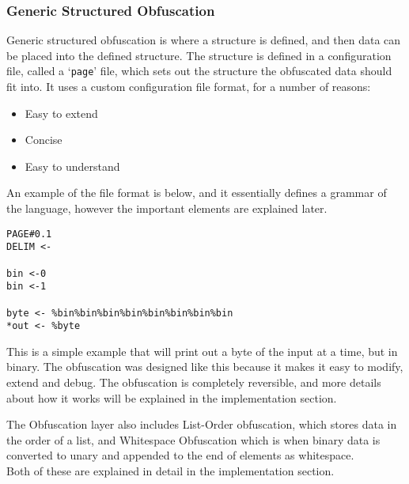 \subsubsection*{Generic Structured Obfuscation}
Generic structured obfuscation is where a structure is defined, and then data can be placed into the defined structure.
The structure is defined in a configuration file, called a `\texttt{page}' file, which sets out the structure the obfuscated data should fit into. It uses a custom configuration file format, for a number of reasons:
\begin{itemize}
    \item Easy to extend
    \item Concise
    \item Easy to understand
\end{itemize}
\newpage
An example of the file format is below, and it essentially defines a grammar of the language, however the important elements are explained later.
\begin{verbatim}
PAGE#0.1
DELIM <-

bin <-0
bin <-1 

byte <- %bin%bin%bin%bin%bin%bin%bin%bin
*out <- %byte
\end{verbatim}
This is a simple example that will print out a byte of the input at a time, but in binary.
The obfuscation was designed like this because it makes it easy to modify, extend and debug.
The obfuscation is completely reversible, and more details about how it works will be explained in the implementation section.\par

The Obfuscation layer also includes List-Order obfuscation, which stores data in the order of a list, and Whitespace Obfuscation which is when binary data is converted to unary and appended to the end of elements as whitespace.\\
Both of these are explained in detail in the implementation section.

